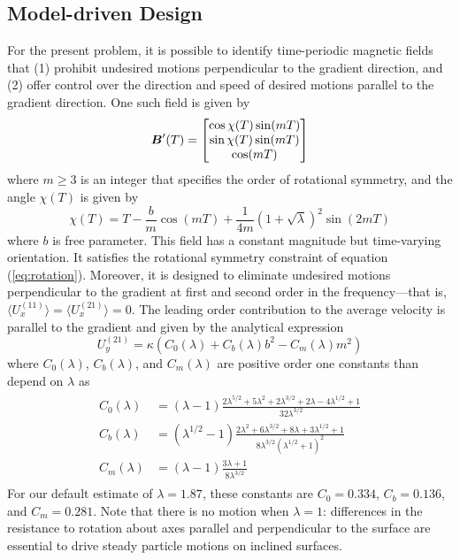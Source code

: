 \subsection{Model-driven Design}

For the present problem, it is possible to identify time-periodic magnetic fields that (1) prohibit undesired motions perpendicular to the gradient direction, and (2) offer control over the direction and speed of desired motions parallel to the gradient direction.  One such field is given by 
\begin{equation}
    \boldsymbol{B}'(T) = \begin{bmatrix} \cos \chi(T) \sin(m T) \\ \sin \chi(T) \sin(m T) \\ \cos(m T) \end{bmatrix} \label{eq:field}
\end{equation}
where $m\geq3$ is an integer that specifies the order of rotational symmetry, and the angle $\chi(T)$ is given by 
\begin{equation}
    \chi(T) = T - \frac{b}{m}\cos(m T)+ \frac{1}{4 m}\left(1+\sqrt{\lambda}\right)^2 \sin(2 m T)
\end{equation}
where $b$ is free parameter.  This field has a constant magnitude but time-varying orientation.  It satisfies the rotational symmetry constraint of equation (\ref{eq:rotation}).  Moreover, it is designed to eliminate undesired motions perpendicular to the gradient at first and second order in the frequency---that is, $\langle U_x^{(11)}\rangle =\langle U_x^{(21)}\rangle = 0$. The leading order contribution to the average velocity is parallel to the gradient and given by the analytical expression
\begin{equation}
    U_y^{(21)} = \kappa \left(C_0(\lambda) + C_b(\lambda) b^2 - C_m(\lambda) m^2\right) \label{eq:Uy21}
\end{equation}
where $C_0(\lambda)$, $C_b(\lambda)$, and $C_m(\lambda)$ are positive order one constants than depend on $\lambda$ as 
\begin{align}
\begin{split}
    C_0(\lambda) &= (\lambda -1)\frac{2\lambda^{5/2} + 5\lambda^2 + 2\lambda^{3/2} + 2\lambda -4\lambda^{1/2}+ 1}{32 \lambda ^{3/2}}
    \\
    C_b(\lambda) &= (\lambda^{1/2}-1) \frac{2\lambda^2 + 6 \lambda^{3/2} + 8\lambda + 3\lambda^{1/2} + 1}{8 \lambda^{3/2} (\lambda^{1/2}+1)^2}
    \\
    C_m(\lambda) &= (\lambda -1)\frac{3 \lambda + 1}{8 \lambda ^{3/2}}
\end{split}
\end{align}
For our default estimate of $\lambda=1.87$, these constants are $C_0=0.334$, $C_b=0.136$, and $C_m=0.281$. Note that there is no motion when $\lambda=1$: differences in the resistance to rotation about axes parallel and perpendicular to the surface are essential to drive steady particle motions on inclined surfaces.  

